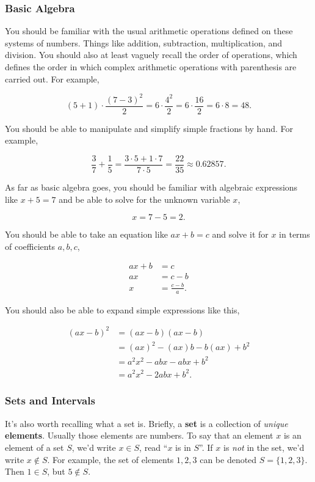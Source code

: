 \documentclass[
  letterpaper,
  DIV=11,
  numbers=noendperiod]{scrreprt}
\begin{document}
\hypertarget{basic-algebra}{%
\subsubsection{Basic Algebra}\label{basic-algebra}}

You should be familiar with the usual arithmetic operations defined on
these systems of numbers. Things like addition, subtraction,
multiplication, and division. You should also at least vaguely recall
the order of operations, which defines the order in which complex
arithmetic operations with parenthesis are carried out. For example,

\[(5+1) \cdot \frac{(7-3)^2}{2} = 6 \cdot \frac{4^2}{2} = 6 \cdot \frac{16}{2} = 6 \cdot 8 = 48.\]

You should be able to manipulate and simplify simple fractions by hand.
For example,

\[\frac{3}{7} + \frac{1}{5} = \frac{3 \cdot 5 + 1 \cdot 7}{7 \cdot 5} = \frac{22}{35} \approx 0.62857.\]

As far as basic algebra goes, you should be familiar with algebraic
expressions like \(x+5=7\) and be able to solve for the unknown variable
\(x\),

\[x=7-5=2.\]

You should be able to take an equation like \(ax + b = c\) and solve it
for \(x\) in terms of coefficients \(a, b, c\),

\begin{align*}
ax + b &= c \\
ax &= c - b \\
x &= \frac{c - b}{a}.
\end{align*}

You should also be able to expand simple expressions like this,

\begin{align*}
(ax - b)^2 &= (ax - b)(ax - b) \\
&= (ax)^2 - (ax)b - b(ax) + b^2 \\
&= a^2x^2 - abx - abx + b^2 \\
&= a^2x^2 - 2abx + b^2.
\end{align*}

\hypertarget{sets-and-intervals}{%
\subsubsection{Sets and Intervals}\label{sets-and-intervals}}

It's also worth recalling what a set is. Briefly, a \textbf{set} is a
collection of \emph{unique} \textbf{elements}. Usually those elements
are numbers. To say that an element \(x\) is an element of a set \(S\),
we'd write \(x \in S\), read ``\(x\) is in \(S\)''. If \(x\) is
\emph{not} in the set, we'd write \(x \notin S\). For example, the set
of elements \(1, 2, 3\) can be denoted \(S = \{1, 2, 3\}\). Then
\(1 \in S\), but \(5 \notin S\).
\end{document}
